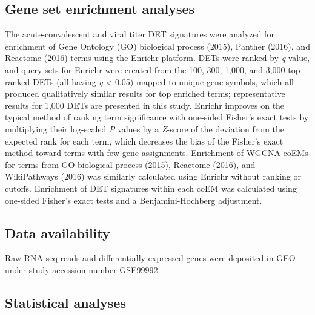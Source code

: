 \subsection{Gene set enrichment analyses}

The acute-convalescent and viral titer DET signatures were analyzed for enrichment of Gene Ontology (GO) biological process (2015), Panther\autocite{Mi2013} (2016), and Reactome\autocite{Fabregat2016} (2016) terms using the Enrichr platform.\autocite{Chen2013} DETs were ranked by \emph{q} value, and query sets for Enrichr were created from the 100, 300, 1,000, and 3,000 top ranked DETs (all having \emph{q} < 0.05) mapped to unique gene symbols, which all produced qualitatively similar results for top enriched terms; representative results for 1,000 DETs are presented in this study. Enrichr improves on the typical method of ranking term significance with one-sided Fisher’s exact tests by multiplying their log-scaled \emph{P} values by a \emph{Z}-score of the deviation from the expected rank for each term, which decreases the bias of the Fisher’s exact method toward terms with few gene assignments.\autocite{Chen2013} Enrichment of WGCNA coEMs for terms from GO biological process (2015), Reactome (2016), and WikiPathways\autocite{Kutmon2016} (2016) was similarly calculated using Enrichr without ranking or cutoffs. Enrichment of DET signatures within each coEM was calculated using one-sided Fisher’s exact tests and a Benjamini-Hochberg adjustment.

\subsection{Data availability}

Raw RNA-seq reads and differentially expressed genes were deposited in GEO under study accession number \href{https://www.ncbi.nlm.nih.gov/geo/query/acc.cgi?acc=GSE99992}{GSE99992}.

\subsection{Statistical analyses}

